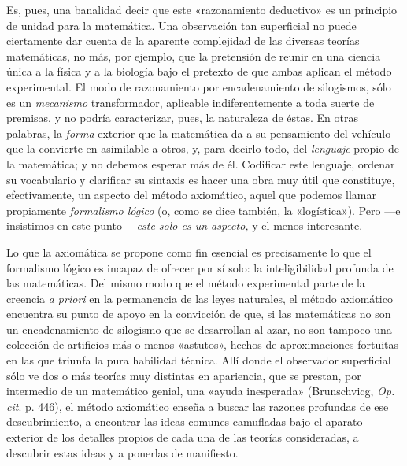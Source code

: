 \documentclass[a4paper, 12pt, draft]{article}
\begin{document}
 Es, pues, una banalidad decir que este «razonamiento deductivo» es un principio de unidad para la matemática. Una observación tan superficial no puede ciertamente dar cuenta de la aparente complejidad de las diversas teorías matemáticas, no más, por ejemplo, que la pretensión de reunir en una ciencia única a la física y a la biología bajo el pretexto de que ambas aplican el método experimental. El modo de razonamiento por encadenamiento de silogismos, sólo es un \textit{mecanismo} transformador, aplicable indiferentemente a toda suerte de premisas, y no podría caracterizar, pues, la naturaleza de éstas. En otras palabras, la \textit{forma} exterior que la matemática da a su pensamiento del vehículo que la convierte en asimilable a otros, y, para decirlo todo, del \textit{lenguaje} propio de la matemática; y no debemos esperar más de él. Codificar este lenguaje, ordenar su vocabulario y clarificar su sintaxis es hacer una obra muy útil que constituye, efectivamente, un aspecto del método axiomático, aquel que podemos llamar propiamente \textit{formalismo lógico} (o, como se dice también, la «logística»). Pero ---e insistimos en este punto--- \textit{este solo es un aspecto,} y el menos interesante. 



Lo que la axiomática se propone como fin esencial es precisamente lo que el formalismo lógico es incapaz de ofrecer por sí solo: la inteligibilidad profunda de las matemáticas. Del mismo modo que el método experimental parte de la creencia \textit{a priori} en la permanencia de las leyes naturales, el método axiomático encuentra su punto de apoyo en la convicción de que, si las matemáticas no son un encadenamiento de silogismo que se desarrollan al azar, no son tampoco una colección de artificios más o menos «astutos», hechos de aproximaciones fortuitas en las que triunfa la pura habilidad técnica. Allí donde el observador superficial sólo ve dos o más teorías muy distintas en apariencia, que se prestan, por intermedio de un matemático genial, una «ayuda inesperada» (Brunschvicg, \textit{Op. cit}. p. 446), el método axiomático enseña a buscar las razones profundas de ese descubrimiento, a encontrar las ideas comunes camufladas bajo el aparato exterior de los detalles propios de cada una de las teorías consideradas, a descubrir estas ideas y a ponerlas de manifiesto.
\end{document}
